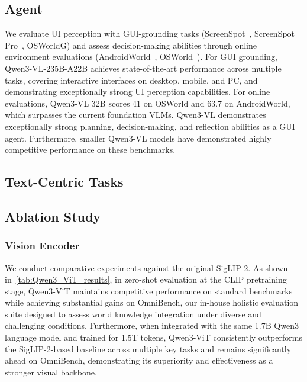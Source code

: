 \documentclass{article} %
\begin{document}
\subsection{Agent}
We evaluate UI perception with GUI-grounding tasks (ScreenSpot~\citep{cheng2024seeclick}, ScreenSpot Pro~\citep{screenspotpro}, OSWorldG\citep{xie2025scalingcomputerusegroundinguser}) and assess decision-making abilities through online environment evaluations (AndroidWorld~\citep{rawles2024androidworld}, OSWorld~\citep{xie2025osworld,osworld_verified}). For GUI grounding, Qwen3-VL-235B-A22B achieves state-of-the-art performance across multiple tasks, covering interactive interfaces on desktop, mobile, and PC, and demonstrating exceptionally strong UI perception capabilities. For online evaluations, Qwen3-VL 32B scores 41 on OSWorld and 63.7 on AndroidWorld, which surpasses the current foundation VLMs. Qwen3-VL demonstrates exceptionally strong planning, decision-making, and reflection abilities as a GUI agent. Furthermore, smaller Qwen3-VL models have demonstrated highly competitive performance on these benchmarks.

\subsection{Text-Centric Tasks}


\subsection{Ablation Study}
\subsubsection{Vision Encoder}
 We conduct comparative experiments against the original SigLIP-2. As shown in~\cref{tab:Qwen3_ViT_results}, in zero-shot evaluation at the CLIP pretraining stage, Qwen3-ViT maintains competitive performance on standard benchmarks while achieving substantial gains on OmniBench, our in-house holistic evaluation suite designed to assess world knowledge integration under diverse and challenging conditions. Furthermore,  when integrated with the same 1.7B Qwen3 language model and trained for 1.5T tokens, Qwen3-ViT consistently outperforms the SigLIP-2-based baseline across multiple key tasks and remains significantly ahead on OmniBench, demonstrating its superiority and effectiveness as a stronger visual backbone.
\end{document}
